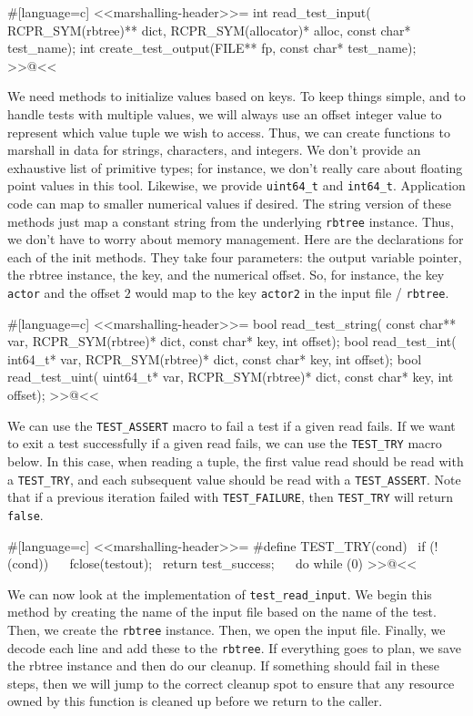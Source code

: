 {#[language=c]
<<marshalling-header>>=
int read_test_input(
    RCPR_SYM(rbtree)** dict, RCPR_SYM(allocator)* alloc, const char* test_name);
int create_test_output(FILE** fp, const char* test_name);
>>@<<

\newpage

We need methods to initialize values based on keys. To keep things simple, and
to handle tests with multiple values, we will always use an offset integer value
to represent which value tuple we wish to access.  Thus, we can create functions
to marshall in data for strings, characters, and integers.  We don't provide an
exhaustive list of primitive types; for instance, we don't really care about
floating point values in this tool.  Likewise, we provide \verb/uint64_t/ and
\verb/int64_t/. Application code can map to smaller numerical values if desired.
The string version of these methods just map a constant string from the
underlying \verb/rbtree/ instance. Thus, we don't have to worry about memory
management.  Here are the declarations for each of the init methods.  They take
four parameters: the output variable pointer, the rbtree instance, the key, and
the numerical offset.  So, for instance, the key \verb/actor/ and the offset $2$
would map to the key \verb/actor2/ in the input file / \verb/rbtree/.

#[language=c]
<<marshalling-header>>=
bool read_test_string(
    const char** var, RCPR_SYM(rbtree)* dict, const char* key, int offset);
bool read_test_int(
    int64_t* var, RCPR_SYM(rbtree)* dict, const char* key, int offset);
bool read_test_uint(
    uint64_t* var, RCPR_SYM(rbtree)* dict, const char* key, int offset);
>>@<<

We can use the \verb/TEST_ASSERT/ macro to fail a test if a given read fails. If
we want to exit a test successfully if a given read fails, we can use the
\verb/TEST_TRY/ macro below.  In this case, when reading a tuple, the first
value read should be read with a \verb/TEST_TRY/, and each subsequent value
should be read with a \verb/TEST_ASSERT/. Note that if a previous iteration
failed with \verb/TEST_FAILURE/, then \verb/TEST_TRY/ will return \verb/false/.

#[language=c]
<<marshalling-header>>=
#define TEST_TRY(cond) \
    if (!(cond)) \
    { \
        fclose(testout); \
        return test_success; \
    } \
    do { } while (0)
>>@<<

We can now look at the implementation of \verb/test_read_input/. We begin this
method by creating the name of the input file based on the name of the test.
Then, we create the \verb/rbtree/ instance. Then, we open the input file.
Finally, we decode each line and add these to the \verb/rbtree/. If everything
goes to plan, we save the rbtree instance and then do our cleanup. If something
should fail in these steps, then we will jump to the correct cleanup spot to
ensure that any resource owned by this function is cleaned up before we return
to the caller.

}
